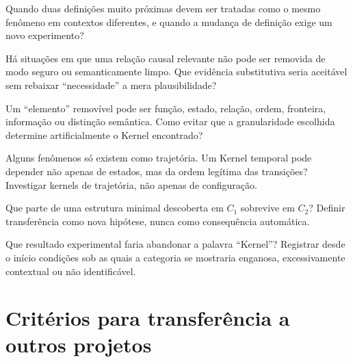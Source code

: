 \documentclass[11pt,a4paper]{article}
\begin{document}
\begin{markerbox}
Quando duas definições muito próximas devem ser tratadas como o mesmo fenômeno em
contextos diferentes, e quando a mudança de definição exige um novo experimento?
\end{markerbox}

\begin{markerbox}
Há situações em que uma relação causal relevante não pode ser removida de modo
seguro ou semanticamente limpo. Que evidência substitutiva seria aceitável sem
rebaixar ``necessidade'' a mera plausibilidade?
\end{markerbox}

\begin{markerbox}
Um ``elemento'' removível pode ser função, estado, relação, ordem, fronteira,
informação ou distinção semântica. Como evitar que a granularidade escolhida determine
artificialmente o Kernel encontrado?
\end{markerbox}

\begin{markerbox}
Alguns fenômenos só existem como trajetória. Um Kernel temporal pode depender não
apenas de estados, mas da ordem legítima das transições? Investigar kernels de
trajetória, não apenas de configuração.
\end{markerbox}

\begin{markerbox}
Que parte de uma estrutura minimal descoberta em \(C_1\) sobrevive em \(C_2\)?
Definir transferência como nova hipótese, nunca como consequência automática.
\end{markerbox}

\begin{markerbox}
Que resultado experimental faria abandonar a palavra ``Kernel''? Registrar desde o
início condições sob as quais a categoria se mostraria enganosa, excessivamente
contextual ou não identificável.
\end{markerbox}

\section{Critérios para transferência a outros projetos}
\end{document}
